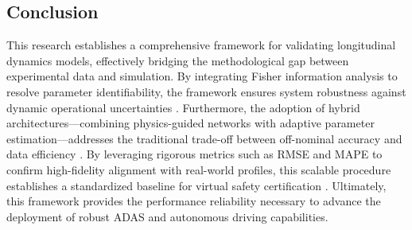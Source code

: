 \documentclass{article}
\begin{document}
\subsection{Conclusion}

This research establishes a comprehensive framework for validating longitudinal dynamics models, effectively bridging the methodological gap between experimental data and simulation. By integrating Fisher information analysis to resolve parameter identifiability, the framework ensures system robustness against dynamic operational uncertainties  \parencite{aaron_kandel_1d1d52c8}. Furthermore, the adoption of hybrid architectures—combining physics-guided networks with adaptive parameter estimation—addresses the traditional trade-off between off-nominal accuracy and data efficiency  \parencite{zhisong_zhou_c50a6dda}. By leveraging rigorous metrics such as RMSE and MAPE to confirm high-fidelity alignment with real-world profiles, this scalable procedure establishes a standardized baseline for virtual safety certification  \parencite[]{muhammad_abdullah_7f4e5d18, umair_rehman_172f6fe3}. Ultimately, this framework provides the performance reliability necessary to advance the deployment of robust ADAS and autonomous driving capabilities.
\printbibliography
\end{document}
